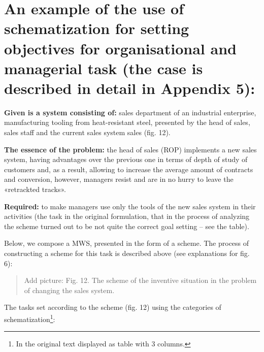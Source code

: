 \documentclass[11pt,a4paper]{book}
\newcommand{\addpicture}[1]{
  \begin{quote} Add picture: #1\end{quote}
}
\begin{document}
\section[Applying schematization]{An example of the use of schematization for
  setting objectives for organisational and managerial task (the case is
  described in detail in Appendix 5):}

\textbf{Given is a system consisting of:} sales department of an industrial
enterprise, manufacturing tooling from heat-resistant steel, presented by the
head of sales, sales staff and the current sales system sales (fig. 12).

\textbf{The essence of the problem:} the head of sales (ROP) implements a new
sales system, having advantages over the previous one in terms of depth of
study of customers and, as a result, allowing to increase the average amount of
contracts and conversion, however, managers resist and are in no hurry to
leave the «retrackted tracks».

\textbf{Required:} to make managers use only the tools of the new sales system
in their activities (the task in the original formulation, that in the process
of analyzing the scheme turned out to be not quite the correct goal setting --
see the table).

Below, we compose a MWS, presented in the form of a scheme.  The process of
constructing a scheme for this task is described above (see explanations for
fig. 6):

\addpicture{Fig. 12. The scheme of the inventive situation in the problem of
  changing the sales system.}

The tasks set according to the scheme (fig. 12) using the categories of
schematization\footnote{In the original text displayed as table with 3
  columns.}:
\end{document}
